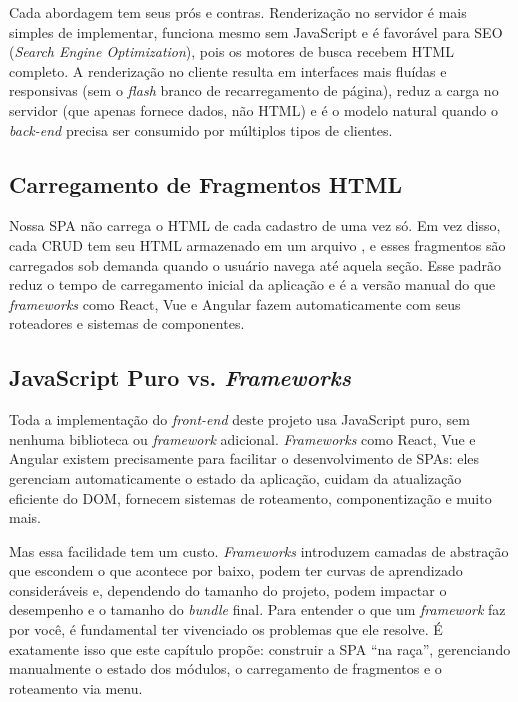 Cada abordagem tem seus prós e contras. Renderização no servidor é mais simples de implementar, funciona mesmo sem JavaScript e é favorável para SEO (\textit{Search Engine Optimization}), pois os motores de busca recebem HTML completo. A renderização no cliente resulta em interfaces mais fluídas e responsivas (sem o \textit{flash} branco de recarregamento de página), reduz a carga no servidor (que apenas fornece dados, não HTML) e é o modelo natural quando o \textit{back-end} precisa ser consumido por múltiplos tipos de clientes.

\subsection{Carregamento de Fragmentos HTML}

Nossa SPA não carrega o HTML de cada cadastro de uma vez só. Em vez disso, cada CRUD tem seu HTML armazenado em um arquivo , e esses fragmentos são carregados sob demanda quando o usuário navega até aquela seção. Esse padrão reduz o tempo de carregamento inicial da aplicação e é a versão manual do que \textit{frameworks} como React, Vue e Angular fazem automaticamente com seus roteadores e sistemas de componentes.

\subsection{JavaScript Puro vs. \textit{Frameworks}}

Toda a implementação do \textit{front-end} deste projeto usa JavaScript puro, sem nenhuma biblioteca ou \textit{framework} adicional. \textit{Frameworks} como React, Vue e Angular existem precisamente para facilitar o desenvolvimento de SPAs: eles gerenciam automaticamente o estado da aplicação, cuidam da atualização eficiente do DOM, fornecem sistemas de roteamento, componentização e muito mais.

Mas essa facilidade tem um custo. \textit{Frameworks} introduzem camadas de abstração que escondem o que acontece por baixo, podem ter curvas de aprendizado consideráveis e, dependendo do tamanho do projeto, podem impactar o desempenho e o tamanho do \textit{bundle} final. Para entender o que um \textit{framework} faz por você, é fundamental ter vivenciado os problemas que ele resolve. É exatamente isso que este capítulo propõe: construir a SPA ``na raça'', gerenciando manualmente o estado dos módulos, o carregamento de fragmentos e o roteamento via menu.

